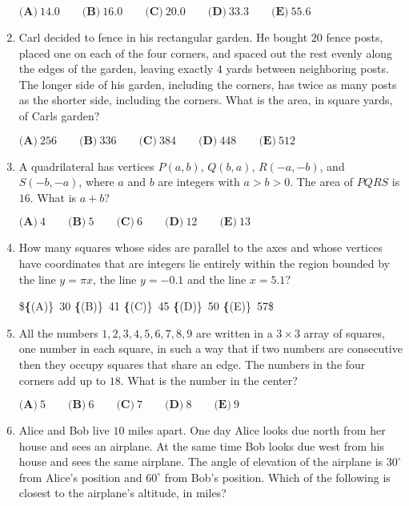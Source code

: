 \documentclass{article}
\begin{document}
\begin{enumerate}[label=\arabic*., itemsep=0.5em]
$\textbf{(A)}\ 14.0\qquad\textbf{(B)}\ 16.0\qquad\textbf{(C)}\ 20.0\qquad\textbf{(D)}\ 33.3\qquad\textbf{(E)}\ 55.6$\par \vspace{0.5em}\item Carl decided to fence in his rectangular garden. He bought $20$ fence posts, placed one on each of the four corners, and spaced out the rest evenly along the edges of the garden, leaving exactly $4$ yards between neighboring posts. The longer side of his garden, including the corners, has twice as many posts as the shorter side, including the corners. What is the area, in square yards, of Carls garden?

$\textbf{(A)}\ 256\qquad\textbf{(B)}\ 336\qquad\textbf{(C)}\ 384\qquad\textbf{(D)}\ 448\qquad\textbf{(E)}\ 512$\par \vspace{0.5em}\item A quadrilateral has vertices $P(a,b)$, $Q(b,a)$, $R(-a, -b)$, and $S(-b, -a)$, where $a$ and $b$ are integers with $a>b>0$. The area of $PQRS$ is $16$. What is $a+b$?

$\textbf{(A)}\ 4 \qquad\textbf{(B)}\ 5 \qquad\textbf{(C)}\ 6 \qquad\textbf{(D)}\ 12  \qquad\textbf{(E)}\ 13$\par \vspace{0.5em}\item How many squares whose sides are parallel to the axes and whose vertices have coordinates that are integers lie entirely within the region bounded by the line $y=\pi x$, the line $y=-0.1$ and the line $x=5.1?$

\$\textbf\{(A)\}\ 30 \qquad
\textbf\{(B)\}\ 41 \qquad
\textbf\{(C)\}\ 45 \qquad
\textbf\{(D)\}\ 50 \qquad
\textbf\{(E)\}\ 57\$\par \vspace{0.5em}\item All the numbers $1, 2, 3, 4, 5, 6, 7, 8, 9$ are written in a $3\times3$ array of squares, one number in each square, in such a way that if two numbers are consecutive then they occupy squares that share an edge. The numbers in the four corners add up to $18$. What is the number in the center?

$\textbf{(A)}\ 5\qquad\textbf{(B)}\ 6\qquad\textbf{(C)}\ 7\qquad\textbf{(D)}\ 8\qquad\textbf{(E)}\ 9$\par \vspace{0.5em}\item Alice and Bob live $10$ miles apart. One day Alice looks due north from her house and sees an airplane. At the same time Bob looks due west from his house and sees the same airplane. The angle of elevation of the airplane is $30^\circ$ from Alice's position and $60^\circ$ from Bob's position. Which of the following is closest to the airplane's altitude, in miles?


\end{enumerate}
\end{document}
